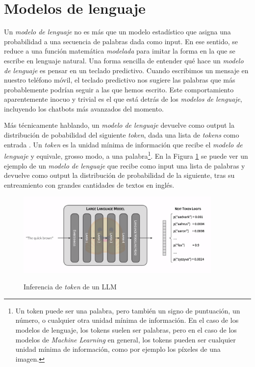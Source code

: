 \section{Modelos de lenguaje}


Un \textit{modelo de lenguaje} no es más que un modelo estadístico que asigna una probabilidad a una secuencia de palabras dada como input. En ese sentido, se reduce a una función matemática \textit{modelada} para imitar la forma en la que se escribe en lenguaje natural. Una forma sencilla de entender qué hace un \textit{modelo de lenguaje} es pensar en un teclado predictivo. Cuando escribimos un mensaje en nuestro teléfono móvil, el teclado predictivo nos sugiere las palabras que más probablemente podrían seguir a las que hemos escrito. Este comportamiento aparentemente inocuo y trivial es el que está detrás de los \textit{modelos de lenguaje}, incluyendo los chatbots más avanzados del momento.

Más técnicamente hablando, un \textit{modelo de lenguaje} devuelve como output la distribución de pobabilidad del siguiente \textit{token}, dada una lista de \textit{tokens} como entrada \citep{GenerationLLMs}. Un \textit{token} es la unidad mínima de información que recibe el \textit{modelo de lenguaje} y equivale, grosso modo, a una palabra\footnote{Un token puede ser una palabra, pero también un signo de puntuación, un número, o cualquier otra unidad mínima de información. En el caso de los modelos de lenguaje, los tokens suelen ser palabras, pero en el caso de los modelos de \textit{Machine Learning} en general, los tokens pueden ser cualquier unidad mínima de información, como por ejemplo los píxeles de una imagen.}. En la Figura \ref{fig:llm_generation} se puede ver un ejemplo de un \textit{modelo de lenguaje} que recibe como input una lista de palabras y devuelve como output la distribución de probabilidad de la siguiente, tras su entreamiento con grandes cantidades de textos en inglés.

\begin{figure}[]
    \caption[Inferencia de \textit{token} de un LLM]{Inferencia de \textit{token} de un LLM}
    \centering
    \includegraphics[width=0.9\textwidth]{./figuras/LLM_predice_token.png}
    \label{fig:llm_generation}
\end{figure}

